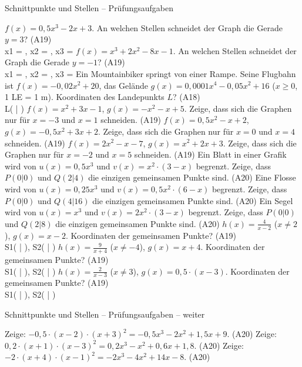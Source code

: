 \begin{aufgabe}{Schnittpunkte und Stellen – Prüfungsaufgaben}
\begin{teile}
\teil $f(x) = 0{,}5x^3 - 2x + 3$. An welchen Stellen schneidet der Graph die Gerade $y = 3$? \hfill (A19) \\ x1 = \leerfeld , x2 = \leerfeld , x3 = \leerfeld
\teil $f(x) = x^3 + 2x^2 - 8x - 1$. An welchen Stellen schneidet der Graph die Gerade $y = -1$? \hfill (A19) \\ x1 = \leerfeld , x2 = \leerfeld , x3 = \leerfeld
\teil Ein Mountainbiker springt von einer Rampe. Seine Flugbahn ist $f(x) = -0{,}02x^2 + 20$, das Gelände $g(x) = 0{,}0001x^4 - 0{,}05x^2 + 16$ ($x \ge 0$, 1 LE = 1 m). Koordinaten des Landepunkts $L$? \hfill (A18) \\ L( \leerfeld | \leerfeld )
\teil $f(x) = x^2 + 3x - 1$, $g(x) = -x^2 - x + 5$. Zeige, dass sich die Graphen nur für $x = -3$ und $x = 1$ schneiden. \hfill (A19)
\teil $f(x) = 0{,}5x^2 - x + 2$, $g(x) = -0{,}5x^2 + 3x + 2$. Zeige, dass sich die Graphen nur für $x = 0$ und $x = 4$ schneiden. \hfill (A19)
\teil $f(x) = 2x^2 - x - 7$, $g(x) = x^2 + 2x + 3$. Zeige, dass sich die Graphen nur für $x = -2$ und $x = 5$ schneiden. \hfill (A19)
\teil Ein Blatt in einer Grafik wird von $u(x) = 0{,}5x^3$ und $v(x) = x^2 \cdot (3 - x)$ begrenzt. Zeige, dass $P(0 | 0)$ und $Q(2 | 4)$ die einzigen gemeinsamen Punkte sind. \hfill (A20)
\teil Eine Flosse wird von $u(x) = 0{,}25x^3$ und $v(x) = 0{,}5x^2 \cdot (6 - x)$ begrenzt. Zeige, dass $P(0 | 0)$ und $Q(4 | 16)$ die einzigen gemeinsamen Punkte sind. \hfill (A20)
\teil Ein Segel wird von $u(x) = x^3$ und $v(x) = 2x^2 \cdot (3 - x)$ begrenzt. Zeige, dass $P(0 | 0)$ und $Q(2 | 8)$ die einzigen gemeinsamen Punkte sind. \hfill (A20)
\teil $h(x) = \frac{4}{x - 2}$ ($x \ne 2$), $g(x) = x - 2$. Koordinaten der gemeinsamen Punkte? \hfill (A19) \\ S1( \leerfeld | \leerfeld ), S2( \leerfeld | \leerfeld )
\teil $h(x) = \frac{9}{x + 4}$ ($x \ne -4$), $g(x) = x + 4$. Koordinaten der gemeinsamen Punkte? \hfill (A19) \\ S1( \leerfeld | \leerfeld ), S2( \leerfeld | \leerfeld )
\teil $h(x) = \frac{2}{x - 3}$ ($x \ne 3$), $g(x) = 0{,}5 \cdot (x - 3)$. Koordinaten der gemeinsamen Punkte? \hfill (A19) \\ S1( \leerfeld | \leerfeld ), S2( \leerfeld | \leerfeld )
\end{teile}
\end{aufgabe}

\begin{aufgabe}{Schnittpunkte und Stellen – Prüfungsaufgaben – weiter}
\begin{teile}
\teil Zeige: $-0{,}5 \cdot (x - 2) \cdot (x + 3)^2 = -0{,}5x^3 - 2x^2 + 1{,}5x + 9$. \hfill (A20)
\teil Zeige: $0{,}2 \cdot (x + 1) \cdot (x - 3)^2 = 0{,}2x^3 - x^2 + 0{,}6x + 1{,}8$. \hfill (A20)
\teil Zeige: $-2 \cdot (x + 4) \cdot (x - 1)^2 = -2x^3 - 4x^2 + 14x - 8$. \hfill (A20)
\end{teile}
\end{aufgabe}

